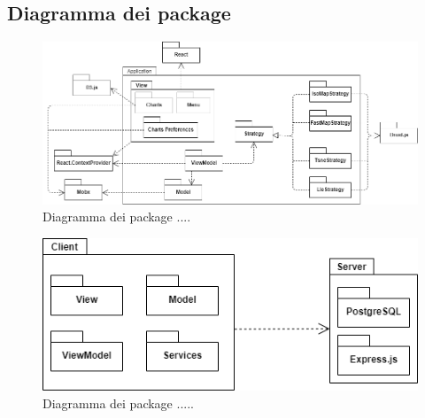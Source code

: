 \subsection{Diagramma dei package}
\begin{figure}[hb]
\includegraphics[width=18cm]{Extra/Allegato Tecnico-Package}
\centering
\caption{Diagramma dei package ....}
\end{figure}
\begin{figure}[hb]
\includegraphics[width=12cm]{Extra/Allegato Tecnico-Package 2}
\centering
\caption{Diagramma dei package .....}
\end{figure}
\newpage

